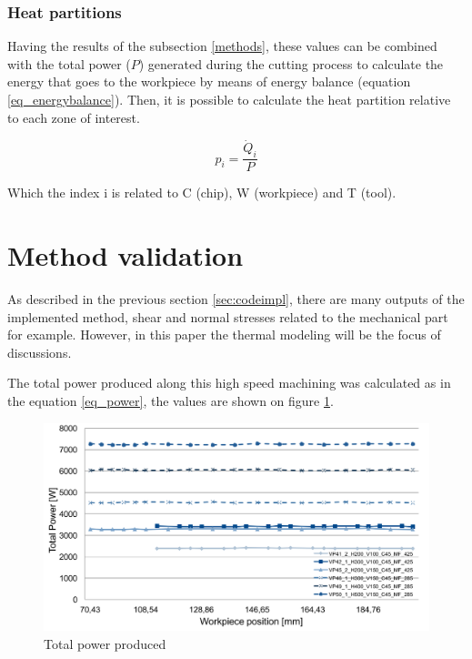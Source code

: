 		\subsubsection{Heat partitions}
			Having the results of the subsection \ref{methods}, these values can be combined with the total power ($P$) generated during the cutting process to calculate the energy that goes to the workpiece by means of energy balance (equation \ref{eq_energybalance}). Then, it is possible to calculate the heat partition relative to each zone of interest.

			\begin{equation} 
			\label{eq_heatpartition}
			p_{i} = \frac{\dot{Q}_{i}}{P}
			\end{equation}

			Which the index i is related to C (chip), W (workpiece) and T (tool).

	\section{Method validation}

		As described in the previous section \ref{sec:codeimpl}, there are many outputs of the implemented method, shear and normal stresses related to the mechanical part for example. However, in this paper the thermal modeling will be the focus of discussions.

		The total power produced along this high speed machining was calculated as in the equation \ref{eq_power}, the values are shown on figure \ref{fig:totPower}.

		\begin{figure}[H]
			\centering
			\captionsetup{justification=centering}
			\includegraphics[scale=0.55]{Imagens/Total_power.png}
			\caption{Total power produced}
			\label{fig:totPower}
		\end{figure}

